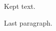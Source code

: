\documentclass{lipics-v2018}
\newcommand{\comment}[1]{}
\begin{document}
Kept \comment{dropped} text.

Last paragraph.
\end{document}
